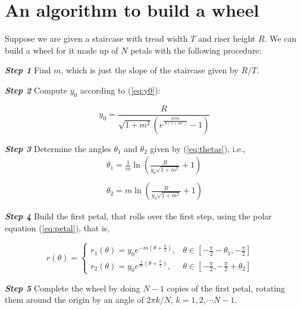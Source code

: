 \documentclass{article}
\theoremstyle{theorem}
\theoremstyle{theorem}
\begin{document}
\section{An algorithm to build a wheel}

Suppose we are given a staircase with tread width $T$ and riser height
$R$. We can build a wheel for it made up of $N$ petals with the following procedure:

\vspace*{0.15 cm}
\noindent \emph{\textbf{Step 1}} Find $m$, which is just the slope of
the staircase given by $R/T$.

\vspace*{0.15 cm}
\noindent \emph{\textbf{Step 2}} Compute $y_0$ according to (\ref{eq:y0}):

  \begin{equation}
    y_0=\frac{R}{\sqrt{1+m^2}\left(e^{\frac{2\pi m}{N(1+m^2)}}-1\right)}
  \end{equation}

\vspace*{0.15 cm}
\noindent \emph{\textbf{Step 3}} Determine the angles $\theta_1$ and
$\theta_2$ given by (\ref{eq:thetas}), i.e.,
\begin{equation}
  \begin{array}{c}
    \displaystyle
    \theta_1=\frac{1}{m}\ln\left(\frac{R}{y_0\sqrt{1+m^2}}+1\right) \\
    \\
    \displaystyle \theta_2=m\ln\left(\frac{R}{y_0\sqrt{1+m^2}}+1\right)
  \end{array}
\end{equation}

\noindent \emph{\textbf{Step 4}} Build the first petal, that rolls
over the first step, using the polar equation (\ref{eq:petal}), that is,

\begin{equation}
  r(\theta)=
  \left \lbrace
    \begin{array}{ll}
      r_1(\theta) = y_0e^{-m\left(\theta+\frac{\pi}{2}\right)}, & \theta \in \left[-\frac{\pi}{2}-\theta_1,-\frac{\pi}{2}\right] \\
      r_2(\theta) = y_0e^{\frac{1}{m}\left(\theta+\frac{\pi}{2}\right)}, & \theta \in \left[-\frac{\pi}{2}, -\frac{\pi}{2}+\theta_2\right]
    \end{array}
  \right. \quad
\end{equation}

\noindent \emph{\textbf{Step 5}} Complete the wheel by doing $N-1$ copies
of the first petal, rotating them around the origin by an angle of $2\pi k/N, \, k=1, 2,
\cdots N-1$.
\end{document}
